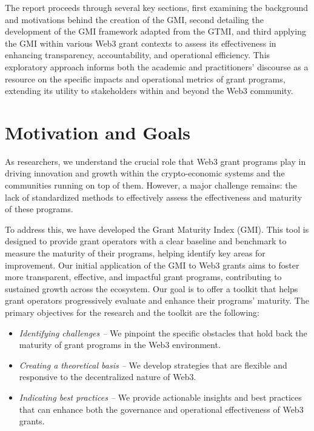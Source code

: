 \documentclass[a4,10pt]{article}
\begin{document}
The report proceeds through several key sections, first examining the background and motivations behind the creation of the GMI, second detailing the development of the GMI framework adapted from the GTMI, and third applying the GMI within various Web3 grant contexts to assess its effectiveness in enhancing transparency, accountability, and operational efficiency. This exploratory approach informs both the academic and practitioners’ discourse as a resource on the specific impacts and operational metrics of grant programs, extending its utility to stakeholders within and beyond the Web3 community.

\section{Motivation and Goals}\label{sec_3}
As researchers, we understand the crucial role that Web3 grant programs play in driving innovation and growth within the crypto-economic systems and the communities running on top of them. However, a major challenge remains: the lack of standardized methods to effectively assess the effectiveness and maturity of these programs.

To address this, we have developed the Grant Maturity Index (GMI). This tool is designed to provide grant operators with a clear baseline and benchmark to measure the maturity of their programs, helping identify key areas for improvement. Our initial application of the GMI to Web3 grants aims to foster more transparent, effective, and impactful grant programs, contributing to sustained growth across the ecosystem. Our goal is to offer a toolkit that helps grant operators progressively evaluate and enhance their programs' maturity. The primary objectives for the research and the toolkit are the following:

\begin{itemize}
    \item \textit{Identifying challenges --} We pinpoint the specific obstacles that hold back the maturity of grant programs in the Web3 environment.
    \item \textit{Creating a theoretical basis --} We develop strategies that are flexible and responsive to the decentralized nature of Web3.
    \item \textit{Indicating best practices --} We provide actionable insights and best practices that can enhance both the governance and operational effectiveness of Web3 grants.
\end{itemize}
\end{document}
